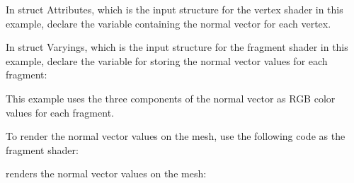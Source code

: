 \begin{DoxyEnumerate}
\item In {\ttfamily struct Attributes}, which is the input structure for the vertex shader in this example, declare the variable containing the normal vector for each vertex.


\begin{DoxyCode}{0}
\DoxyCodeLine{++}
\DoxyCodeLine{\ \ \ \{}
\DoxyCodeLine{\ \ \ \ \ \ \ \textcolor{comment}{//\ Declaring\ the\ variable\ containing\ the\ normal\ vector\ for\ each\ vertex.}}
\DoxyCodeLine{\ \ \ \};}

\end{DoxyCode}

\item In {\ttfamily struct Varyings}, which is the input structure for the fragment shader in this example, declare the variable for storing the normal vector values for each fragment\+:


\begin{DoxyCode}{0}
\DoxyCodeLine{++}
\DoxyCodeLine{\ \ \ \{}
\DoxyCodeLine{\ \ \ \ \ \ \ \textcolor{comment}{//\ The\ variable\ for\ storing\ the\ normal\ vector\ values.}}
\DoxyCodeLine{\ \ \ \};}

\end{DoxyCode}


This example uses the three components of the normal vector as RGB color values for each fragment.
\item To render the normal vector values on the mesh, use the following code as the fragment shader\+:


\begin{DoxyCode}{0}
\DoxyCodeLine{++}
\DoxyCodeLine{\ \ \ \{}
\DoxyCodeLine{\ \ \ \}}

\end{DoxyCode}

\item {} renders the normal vector values on the mesh\+:




\end{DoxyEnumerate}
